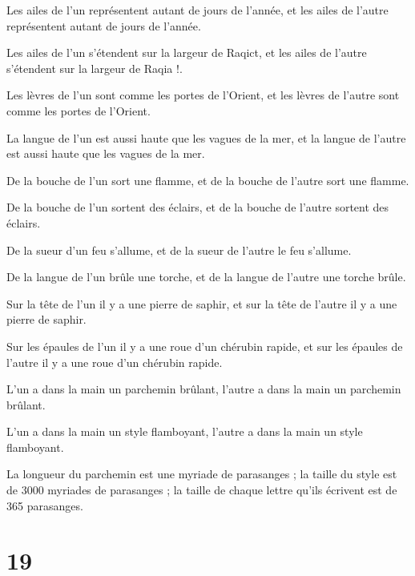\par Les ailes de l'un représentent autant de jours de l'année, et les ailes de l'autre représentent autant de jours de l'année.

\par Les ailes de l'un s'étendent sur la largeur de Raqict, et les ailes de l'autre s'étendent sur la largeur de Raqia !.

\par Les lèvres de l'un sont comme les portes de l'Orient, et les lèvres de l'autre sont comme les portes de l'Orient.

\par La langue de l'un est aussi haute que les vagues de la mer, et la langue de l'autre est aussi haute que les vagues de la mer.

\par De la bouche de l'un sort une flamme, et de la bouche de l'autre sort une flamme.

\par De la bouche de l'un sortent des éclairs, et de la bouche de l'autre sortent des éclairs.

\par De la sueur d'un feu s'allume, et de la sueur de l'autre le feu s'allume.

\par De la langue de l'un brûle une torche, et de la langue de l'autre une torche brûle.

\par Sur la tête de l'un il y a une pierre de saphir, et sur la tête de l'autre il y a une pierre de saphir.

\par Sur les épaules de l'un il y a une roue d'un chérubin rapide, et sur les épaules de l'autre il y a une roue d'un chérubin rapide.

\par L'un a dans la main un parchemin brûlant, l'autre a dans la main un parchemin brûlant.

\par L'un a dans la main un style flamboyant, l'autre a dans la main un style flamboyant.

\par La longueur du parchemin est une myriade de parasanges ; la taille du style est de 3000 myriades de parasanges ; la taille de chaque lettre qu’ils écrivent est de 365 parasanges.

\chapter{19}

